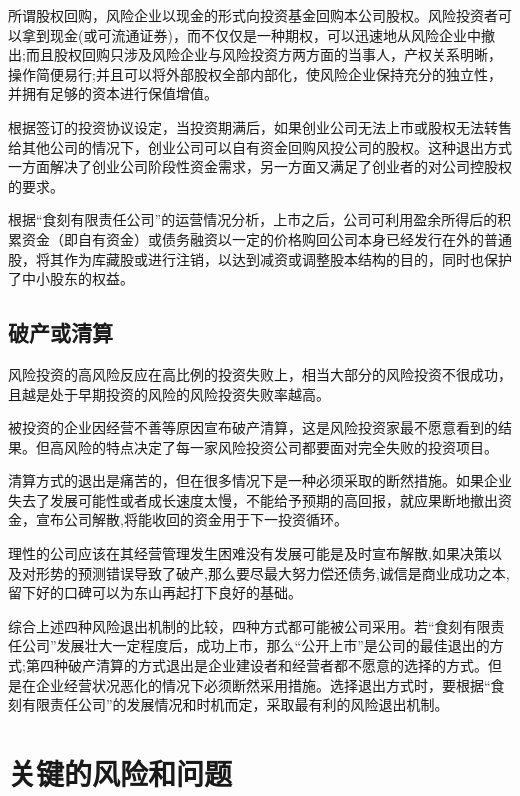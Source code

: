 \documentclass[UTF8,12pt]{ctexart}
\numberwithin{figure}{section}%
\begin{document}
\begin{spacing}{2}
所谓股权回购，风险企业以现金的形式向投资基金回购本公司股权。风险投资者可以拿到现金(或可流通证券)，而不仅仅是一种期权，可以迅速地从风险企业中撤出;而且股权回购只涉及风险企业与风险投资方两方面的当事人，产权关系明晰，操作简便易行;并且可以将外部股权全部内部化，使风险企业保持充分的独立性，并拥有足够的资本进行保值增值。

根据签订的投资协议设定，当投资期满后，如果创业公司无法上市或股权无法转售给其他公司的情况下，创业公司可以自有资金回购风投公司的股权。这种退出方式一方面解决了创业公司阶段性资金需求，另一方面又满足了创业者的对公司控股权的要求。 

根据“食刻有限责任公司”的运营情况分析，上市之后，公司可利用盈余所得后的积累资金（即自有资金）或债务融资以一定的价格购回公司本身已经发行在外的普通股，将其作为库藏股或进行注销，以达到减资或调整股本结构的目的，同时也保护了中小股东的权益。

\subsection{破产或清算}

风险投资的高风险反应在高比例的投资失败上，相当大部分的风险投资不很成功，且越是处于早期投资的风险的风险投资失败率越高。

被投资的企业因经营不善等原因宣布破产清算，这是风险投资家最不愿意看到的结果。但高风险的特点决定了每一家风险投资公司都要面对完全失败的投资项目。

清算方式的退出是痛苦的，但在很多情况下是一种必须采取的断然措施。如果企业失去了发展可能性或者成长速度太慢，不能给予预期的高回报，就应果断地撤出资金，宣布公司解散,将能收回的资金用于下一投资循环。

理性的公司应该在其经营管理发生困难没有发展可能是及时宣布解散,如果决策以及对形势的预测错误导致了破产,那么要尽最大努力偿还债务,诚信是商业成功之本,留下好的口碑可以为东山再起打下良好的基础。

综合上述四种风险退出机制的比较，四种方式都可能被公司采用。若“食刻有限责任公司”发展壮大一定程度后，成功上市，那么“公开上市”是公司的最佳退出的方式;第四种破产清算的方式退出是企业建设者和经营者都不愿意的选择的方式。但是在企业经营状况恶化的情况下必须断然采用措施。选择退出方式时，要根据“食刻有限责任公司”的发展情况和时机而定，采取最有利的风险退出机制。

\newpage
\section{关键的风险和问题}

\end{spacing}
\end{document}
